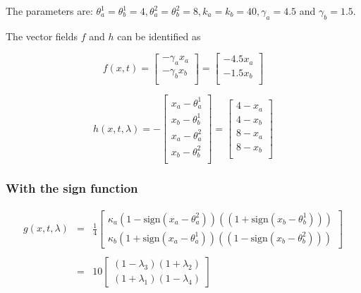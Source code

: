 \documentclass{article}
\begin{document}
The parameters are: $\theta_a^1=\theta_b^1=4, \theta_a^2=\theta_b^2=8, k_a=k_b=40, \gamma_a=4.5$ and $\gamma_b=1.5$.

The vector fields $f$ and $h$ can be identified as


\begin{equation}
  \label{eq:f1}
  f(x,t) = \left[
    \begin{array}{l}
      - \gamma_a x_a \\
      - \gamma_b x_b \\
    \end{array}
  \right]=\left[
    \begin{array}{l}
      - 4.5 x_a \\
      - 1.5 x_b \\
    \end{array}
  \right]
\end{equation}

\begin{equation}
  \label{eq:h1}
  h(x,t,\lambda) = -  \left[
    \begin{array}{l}
       x_a - \theta_a^1 \\
       x_b - \theta_b^1 \\
       x_a - \theta_a^2 \\
       x_b - \theta_b^2 \\
    \end{array}
  \right]=\left[
    \begin{array}{l}
      4- x_a \\
      4- x_b \\
      8- x_a \\
      8- x_b \\
    \end{array}
  \right]
\end{equation}


\subsubsection*{With the sign function}
\begin{equation}
  \label{eq:g1sign}
  \begin{array}{lcl}
  g(x,t,\lambda) &=&\displaystyle\frac 1 4  \left[
    \begin{array}{l}
      \kappa_a      (1- \mbox{sign}( x_a - \theta_a^2))((1+ \mbox{sign}( x_b - \theta_b^1)))\\
      \kappa_b      (1+ \mbox{sign}( x_a - \theta_a^1))((1- \mbox{sign}( x_b - \theta_b^2)))
    \end{array}
  \right]\\ \\
  &=& 10   \left[
    \begin{array}{l}
          (1-\lambda_3)(1+\lambda_2)\\
          (1+\lambda_1)(1-\lambda_4)
    \end{array}
  \right]
\end{array}
\end{equation}
\end{document}
